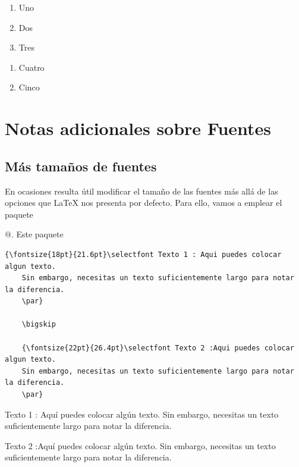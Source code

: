 \documentclass[a4,10pt]{aleph-notas}
\begin{document}
\begin{enumerate}[series = ejercicios]
    \item 
        Uno
    \item
        Dos
    \item
        Tres
\end{enumerate}

\begin{enumerate}[resume* = ejercicios]
    \item 
        Cuatro
    \item
        Cinco
\end{enumerate}

\section{Notas adicionales sobre Fuentes}

\subsection{Más tamaños de fuentes}

En ocasiones resulta útil modificar el tamaño de las fuentes más allá de las opciones que \LaTeX{} nos presenta por defecto. Para ello, vamos a emplear el paquete \verb@\usepackage{anyfontsize}@. Este paquete 
\begin{lstlisting}[frame=single]
    {\fontsize{18pt}{21.6pt}\selectfont Texto 1 : Aqui puedes colocar algun texto. 
    Sin embargo, necesitas un texto suficientemente largo para notar la diferencia.
    \par}

    \bigskip
    
    {\fontsize{22pt}{26.4pt}\selectfont Texto 2 :Aqui puedes colocar algun texto. 
    Sin embargo, necesitas un texto suficientemente largo para notar la diferencia. 
    \par}
\end{lstlisting}

{\fontsize{18pt}{21.6pt}\selectfont Texto 1 : Aquí puedes colocar algún texto. Sin embargo, necesitas un texto suficientemente largo para notar la diferencia.\par}

\bigskip

{\fontsize{22pt}{26.4pt}\selectfont Texto 2 :Aquí puedes colocar algún texto. Sin embargo, necesitas un texto suficientemente largo para notar la diferencia. \par}
\end{document}

